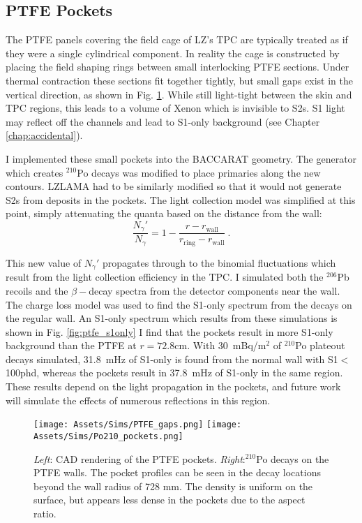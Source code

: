 \subsection{PTFE Pockets}
\label{sec:pockets}

The PTFE panels covering the field cage of LZ's TPC are typically treated as if they were a single cylindrical component.
In reality the cage is constructed by placing the field shaping rings between small interlocking PTFE sections.
Under thermal contraction these sections fit together tightly, but small gaps exist in the vertical direction, as shown in Fig. \ref{fig:pockets}.
While still light-tight between the skin and TPC regions, this leads to a volume of Xenon which is invisible to S2s.
S1 light may reflect off the channels and lead to S1-only background (see Chapter \ref{chap:accidental}).

I implemented these small pockets into the BACCARAT geometry.
The generator which creates $^{210}$Po decays was modified to place primaries along the new contours.
LZLAMA had to be similarly modified so that it would not generate S2s from deposits in the pockets.
The light collection model was simplified at this point, simply attenuating the quanta based on the distance from the wall: 
\begin{equation}
    \frac{N_{\gamma}'} {N_{\gamma}} = 1-\frac{r-r_{\text{wall}}}{r_{\text{ring}}-r_{\text{wall}}}~.
\end{equation}

This new value of $N_\gamma'$ propagates through to the binomial fluctuations which result from the light collection efficiency in the TPC.
I simulated both the $^{206}$Pb recoils and the $\beta-$decay spectra from the detector components near the wall.
The charge loss model was used to find the S1-only spectrum from the decays on the regular wall.
An S1-only spectrum which results from these simulations is shown in Fig. \ref{fig:ptfe_s1only}
I find that the pockets result in more S1-only background than the PTFE at $r=72.8$cm.
With 30~mBq/m$^2$ of $^{210}$Po plateout decays simulated, 31.8~mHz of S1-only is found from the normal wall with S1$<$100phd, whereas the pockets result in 37.8~mHz of S1-only in the same region.
These results depend on the light propagation in the pockets, and future work will simulate the effects of numerous reflections in this region.

\begin{figure}
    \centering
      \texttt{[image: Assets/Sims/PTFE\_gaps.png]}
    \texttt{[image: Assets/Sims/Po210\_pockets.png]}
    \caption[Simulations of the gaps in the PTFE walls.]%
    {
    \textit{Left}: CAD rendering of the PTFE pockets.
    \textit{Right}:$^{210}$Po decays on the PTFE walls. 
    The pocket profiles can be seen in the decay locations beyond the wall radius of 728 mm.
    The density is uniform on the surface, but appears less dense in the pockets due to the aspect ratio.}
    \label{fig:pockets}
\end{figure}

